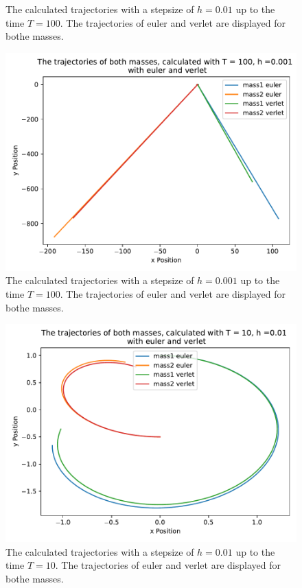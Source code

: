 \begin{itemize}
\begin{figure}
        \caption{The calculated trajectories with a stepsize of $h=0.01$ up to the time $T=100$.
        The trajectories of euler and verlet are displayed for bothe masses.}
        \label{}
    \end{figure}
    \begin{figure}
        \centering
        \includegraphics[width=\textwidth]{plots/plotsT_100_h_0001/plota.pdf}
        \caption{The calculated trajectories with a stepsize of $h=0.001$ up to the time $T=100$.
        The trajectories of euler and verlet are displayed for bothe masses.}
        \label{}
    \end{figure}
    \begin{figure}
        \centering
        \includegraphics[width=\textwidth]{plots/plotsT_10_h_001/plota.pdf}
        \caption{The calculated trajectories with a stepsize of $h=0.01$ up to the time $T=10$.
        The trajectories of euler and verlet are displayed for bothe masses.}
        \label{fig:h_001_10}
    \end{figure}
\FloatBarrier


\end{itemize}
